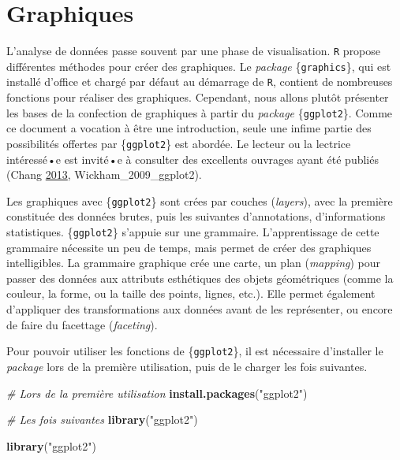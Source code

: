 \documentclass[
  11pt,
]{book}
\newenvironment{Shaded}{\begin{snugshade}}{\end{snugshade}}
\newcommand{\CommentTok}[1]{\textcolor[rgb]{0.56,0.35,0.01}{\textit{#1}}}
\newcommand{\KeywordTok}[1]{\textcolor[rgb]{0.13,0.29,0.53}{\textbf{#1}}}
\newcommand{\NormalTok}[1]{#1}
\newcommand{\StringTok}[1]{\textcolor[rgb]{0.31,0.60,0.02}{#1}}
\numberwithin{equation}{section}
\numberwithin{countremarque}{section}
\begin{document}
\hypertarget{graphiques}{%
\chapter{Graphiques}\label{graphiques}}

L'analyse de données passe souvent par une phase de visualisation. \texttt{R} propose différentes méthodes pour créer des graphiques. Le \emph{package} \{\texttt{graphics}\}, qui est installé d'office et chargé par défaut au démarrage de \texttt{R}, contient de nombreuses fonctions pour réaliser des graphiques. Cependant, nous allons plutôt présenter les bases de la confection de graphiques à partir du \emph{package} \{\texttt{ggplot2}\}. Comme ce document a vocation à être une introduction, seule une infime partie des possibilités offertes par \{\texttt{ggplot2}\} est abordée. Le lecteur ou la lectrice intéressé•e est invité•e à consulter des excellents ouvrages ayant été publiés (Chang \protect\hyperlink{ref-Chang_2013_R}{2013}, Wickham\_2009\_ggplot2).

Les graphiques avec \{\texttt{ggplot2}\} sont crées par couches (\emph{layers}), avec la première constituée des données brutes, puis les suivantes d'annotations, d'informations statistiques. \{\texttt{ggplot2}\} s'appuie sur une grammaire. L'apprentissage de cette grammaire nécessite un peu de temps, mais permet de créer des graphiques intelligibles. La grammaire graphique crée une carte, un plan (\emph{mapping}) pour passer des données aux attributs esthétiques des objets géométriques (comme la couleur, la forme, ou la taille des points, lignes, etc.). Elle permet également d'appliquer des transformations aux données avant de les représenter, ou encore de faire du facettage (\emph{faceting}).

Pour pouvoir utiliser les fonctions de \{\texttt{ggplot2}\}, il est nécessaire d'installer le \emph{package} lors de la première utilisation, puis de le charger les fois suivantes.

\begin{Shaded}
\begin{Highlighting}[]
\CommentTok{\# Lors de la première utilisation}
\KeywordTok{install.packages}\NormalTok{(}\StringTok{"ggplot2"}\NormalTok{)}

\CommentTok{\# Les fois suivantes}
\KeywordTok{library}\NormalTok{(}\StringTok{"ggplot2"}\NormalTok{)}
\end{Highlighting}
\end{Shaded}

\begin{Shaded}
\begin{Highlighting}[]
\KeywordTok{library}\NormalTok{(}\StringTok{"ggplot2"}\NormalTok{)}
\end{Highlighting}
\end{Shaded}
\end{document}
